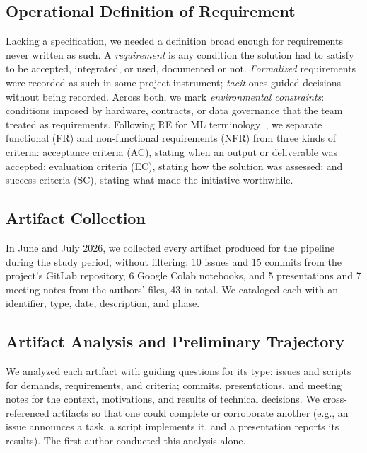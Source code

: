 \documentclass[sigconf,nonacm]{acmart}
\newif\ifshownotes
\newcommand{\gnote}[1]{\ifshownotes{\color{blue}\textbf{[G:} #1\textbf{]}}\fi}
\newcommand{\rnote}[1]{\ifshownotes{\color{red}\textbf{[R:} #1\textbf{]}}\fi}
\begin{document}
\subsection{Operational Definition of Requirement}
\label{sec:req-def}
Lacking a specification, we needed a definition broad enough for requirements never written as such. A \emph{requirement} is any condition the solution had to satisfy to be accepted, integrated, or used, documented or not. \emph{Formalized} requirements were recorded as such in some project instrument; \emph{tacit} ones guided decisions without being recorded. Across both, we mark \emph{environmental constraints}: conditions imposed by hardware, contracts, or data governance that the team treated as requirements. Following RE for ML terminology~\cite{vogelsang2019,habibullah2023}, we separate functional (FR) and non-functional requirements (NFR) from three kinds of criteria: acceptance criteria (AC), stating when an output or deliverable was accepted; evaluation criteria (EC), stating how the solution was assessed; and success criteria (SC), stating what made the initiative worthwhile.

\subsection{Artifact Collection}
\label{sec:collection}
In June and July 2026, we collected every artifact produced for the pipeline during the study period, without filtering: 10 issues and 15 commits from the project's GitLab repository, 6 Google Colab notebooks, and 5 presentations and 7 meeting notes from the authors' files, 43 in total. We cataloged each with an identifier, type, date, description, and phase.

\subsection{Artifact Analysis and Preliminary Trajectory}
\label{sec:artifact-analysis}
We analyzed each artifact with guiding questions for its type: issues and scripts for demands, requirements, and criteria; commits, presentations, and meeting notes for the context, motivations, and results of technical decisions. We cross-referenced artifacts so that one could complete or corroborate another (e.g., an issue announces a task, a script implements it, and a presentation reports its results). The first author conducted this analysis alone.
\end{document}

